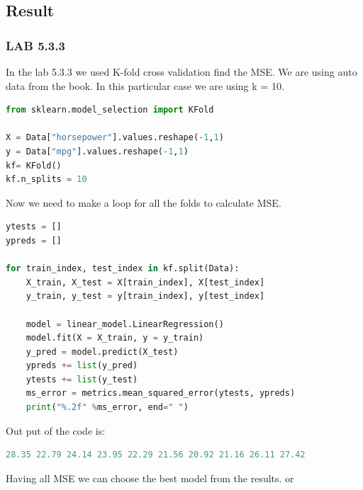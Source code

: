 \subsection{Result}
\subsubsection*{LAB 5.3.3}%
In the lab 5.3.3 we used K-fold cross validation find the MSE. We are using auto data from the book. In this particular case we are using k = 10. 
\begin{lstlisting}[language=Python]
from sklearn.model_selection import KFold

X = Data["horsepower"].values.reshape(-1,1) 
y = Data["mpg"].values.reshape(-1,1)
kf= KFold()
kf.n_splits = 10
\end{lstlisting}
Now we need to make a loop for all the folds to calculate MSE.   

\begin{lstlisting}[language=Python]
ytests = []
ypreds = []

for train_index, test_index in kf.split(Data):
	X_train, X_test = X[train_index], X[test_index]
	y_train, y_test = y[train_index], y[test_index]

	model = linear_model.LinearRegression()
	model.fit(X = X_train, y = y_train)
	y_pred = model.predict(X_test)  
	ypreds += list(y_pred)
	ytests += list(y_test)
	ms_error = metrics.mean_squared_error(ytests, ypreds)
	print("%.2f" %ms_error, end=" ")
\end{lstlisting}
Out put of the code is:
\begin{lstlisting}[language=Python]
28.35 22.79 24.14 23.95 22.29 21.56 20.92 21.16 26.11 27.42 
\end{lstlisting}
Having all MSE we can choose the best model from the results. or 